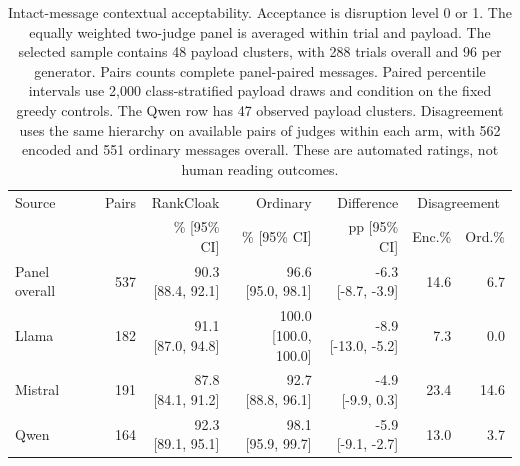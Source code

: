 \begin{table}[H]\centering\small
\begin{tabular}{lrrrrrr}\toprule
Source & Pairs & RankCloak & Ordinary & Difference & \multicolumn{2}{c}{Disagreement}\\
 & & \% [95\% CI] & \% [95\% CI] & pp [95\% CI] & Enc.\% & Ord.\%\\\midrule
Panel overall & 537 & \shortstack{90.3\\{}[88.4, 92.1]} & \shortstack{96.6\\{}[95.0, 98.1]} & \shortstack{-6.3\\{}[-8.7, -3.9]} & 14.6 & 6.7\\
Llama & 182 & \shortstack{91.1\\{}[87.0, 94.8]} & \shortstack{100.0\\{}[100.0, 100.0]} & \shortstack{-8.9\\{}[-13.0, -5.2]} & 7.3 & 0.0\\
Mistral & 191 & \shortstack{87.8\\{}[84.1, 91.2]} & \shortstack{92.7\\{}[88.8, 96.1]} & \shortstack{-4.9\\{}[-9.9, 0.3]} & 23.4 & 14.6\\
Qwen & 164 & \shortstack{92.3\\{}[89.1, 95.1]} & \shortstack{98.1\\{}[95.9, 99.7]} & \shortstack{-5.9\\{}[-9.1, -2.7]} & 13.0 & 3.7\\
\bottomrule\end{tabular}
\caption{Intact-message contextual acceptability. Acceptance is disruption level 0 or 1. The equally weighted two-judge panel is averaged within trial and payload. The selected sample contains 48 payload clusters, with 288 trials overall and 96 per generator. Pairs counts complete panel-paired messages. Paired percentile intervals use 2,000 class-stratified payload draws and condition on the fixed greedy controls. The Qwen row has 47 observed payload clusters. Disagreement uses the same hierarchy on available pairs of judges within each arm, with 562 encoded and 551 ordinary messages overall. These are automated ratings, not human reading outcomes.}\label{tab:v4-contextual}
\end{table}
